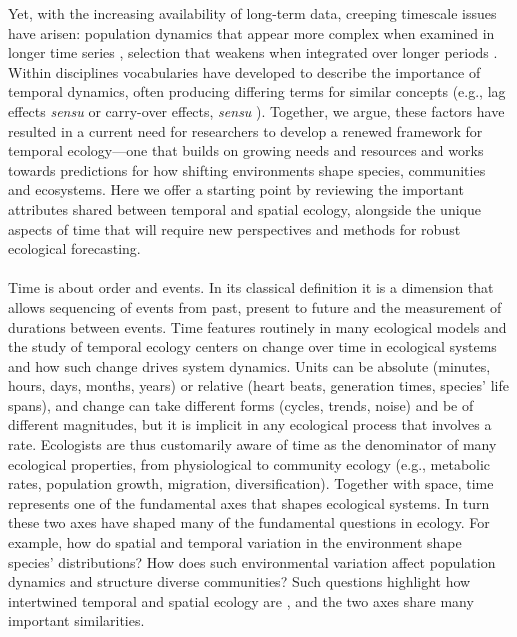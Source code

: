 \documentclass[11pt,a4paper,oneside]{article}
\begin{document}
Yet, with the increasing availability of long-term data, creeping timescale issues have arisen: population dynamics that appear more complex when examined in longer time series \citep{Ziebarth2010}, selection that weakens when integrated over longer periods \citep{schoener2011,Uyeda2011}. Within disciplines vocabularies have developed to describe the importance of temporal dynamics, often producing differing terms for similar concepts (e.g., lag effects \emph{sensu} \cite{Reichmann2013} or carry-over effects, \emph{sensu} \cite{Betini2013}). Together, we argue, these factors have resulted in a current need for researchers to develop a renewed framework for temporal ecology---one that builds on growing needs and resources and works towards predictions for how shifting environments shape species, communities and ecosystems. Here we offer a starting point by reviewing the important attributes shared between temporal and spatial ecology, alongside the unique aspects of time that will require new perspectives and methods for robust ecological forecasting. \\

\\

\noindent Time is about order and events. In its classical definition it is a dimension that allows sequencing of events from past, present to future and the measurement of durations between events. Time features routinely in many ecological models and the study of temporal ecology centers on change over time in ecological systems and how such change drives system dynamics. Units can be absolute (minutes, hours, days, months, years) or relative (heart beats, generation times, species’ life spans), and change can take different forms (cycles, trends, noise) and be of different magnitudes, but it is implicit in any ecological process that involves a rate. Ecologists are thus customarily aware of time as the denominator of many ecological properties, from physiological to community ecology (e.g., metabolic rates, population growth, migration, diversification). Together with space, time represents one of the fundamental axes that shapes ecological systems. In turn these two axes have shaped many of the fundamental questions in ecology. For example, how do spatial and temporal variation in the environment shape species' distributions? How does such environmental variation affect population dynamics and structure diverse communities? Such questions highlight how intertwined temporal and spatial ecology are \citep{delcourt1983}, and the two axes share many important similarities.
\end{document}
